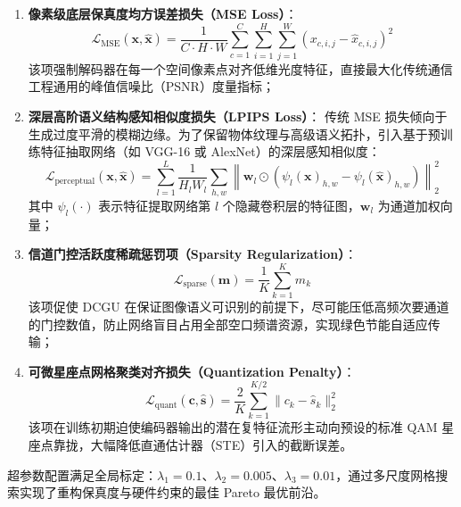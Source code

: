 \begin{enumerate}
  \item \textbf{像素级底层保真度均方误差损失（MSE Loss）}：
  \begin{equation}
    \mathcal{L}_{\text{MSE}}(\bm{x}, \hat{\bm{x}}) = \frac{1}{C \cdot H \cdot W} \sum_{c=1}^C \sum_{i=1}^H \sum_{j=1}^W \left( x_{c,i,j} - \hat{x}_{c,i,j} \right)^2
    \label{eq:mse_loss_detail}
  \end{equation}
  该项强制解码器在每一个空间像素点对齐低维光度特征，直接最大化传统通信工程通用的峰值信噪比（PSNR）度量指标；
  
  \item \textbf{深层高阶语义结构感知相似度损失（LPIPS Loss）}：
  传统 MSE 损失倾向于生成过度平滑的模糊边缘。为了保留物体纹理与高级语义拓扑，引入基于预训练特征抽取网络（如 VGG-16 或 AlexNet）的深层感知相似度：
  \begin{equation}
    \mathcal{L}_{\text{perceptual}}(\bm{x}, \hat{\bm{x}}) = \sum_{l=1}^L \frac{1}{H_l W_l} \sum_{h, w} \left\| \bm{w}_l \odot \left( \psi_l(\bm{x})_{h,w} - \psi_l(\hat{\bm{x}})_{h,w} \right) \right\|_2^2
    \label{eq:lpips_loss_detail}
  \end{equation}
  其中 $\psi_l(\cdot)$ 表示特征提取网络第 $l$ 个隐藏卷积层的特征图，$\bm{w}_l$ 为通道加权向量；
  
  \item \textbf{信道门控活跃度稀疏惩罚项（Sparsity Regularization）}：
  \begin{equation}
    \mathcal{L}_{\text{sparse}}(\bm{m}) = \frac{1}{K} \sum_{k=1}^K m_k
    \label{eq:sparse_loss_detail}
  \end{equation}
  该项促使 DCGU 在保证图像语义可识别的前提下，尽可能压低高频次要通道的门控数值，防止网络盲目占用全部空口频谱资源，实现绿色节能自适应传输；
  
  \item \textbf{可微星座点网格聚类对齐损失（Quantization Penalty）}：
  \begin{equation}
    \mathcal{L}_{\text{quant}}(\bm{c}, \hat{\bm{s}}) = \frac{2}{K} \sum_{k=1}^{K/2} \| c_k - \hat{s}_k \|_2^2
    \label{eq:quant_loss_detail}
  \end{equation}
  该项在训练初期迫使编码器输出的潜在复特征流形主动向预设的标准 QAM 星座点靠拢，大幅降低直通估计器（STE）引入的截断误差。
\end{enumerate}

超参数配置满足全局标定：$\lambda_1 = 0.1$、$\lambda_2 = 0.005$、$\lambda_3 = 0.01$，通过多尺度网格搜索实现了重构保真度与硬件约束的最佳 Pareto 最优前沿。

